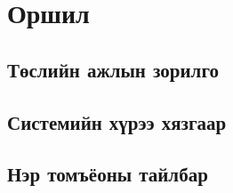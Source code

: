 \chapter{Оршил}
\section{Төслийн ажлын зорилго}
\section{Системийн хүрээ хязгаар}
\section{Нэр томъёоны тайлбар}